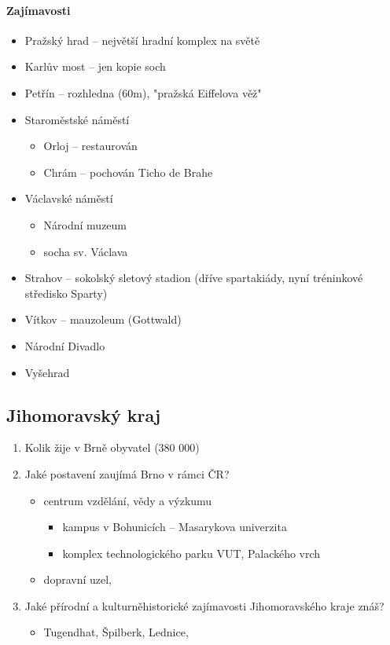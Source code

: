 \paragraph{Zajímavosti}
\begin{itemize}
\item Pražský hrad -- největší hradní komplex na světě
\item Karlův most -- jen kopie soch
\item Petřín -- rozhledna (60m), "pražská Eiffelova věž"
\item Staroměstské náměstí
	\begin{itemize}
	\item Orloj -- restaurován
	\item Chrám -- pochován Ticho de Brahe
	\end{itemize}
\item Václavské náměstí
	\begin{itemize}
	\item Národní muzeum
	\item socha sv. Václava
	\end{itemize}
\item Strahov -- sokolský sletový stadion (dříve spartakiády, nyní tréninkové středisko Sparty)
\item Vítkov -- mauzoleum (Gottwald)
\item Národní Divadlo
\item Vyšehrad		
\end{itemize}

\subsection{Jihomoravský kraj}
\begin{enumerate}
\item Kolik žije v Brně obyvatel (380 000)
\item Jaké postavení zaujímá Brno v rámci ČR?
	\begin{itemize}
	\item centrum vzdělání, vědy a výzkumu
		\begin{itemize}
		\item kampus v Bohunicích -- Masarykova univerzita
		\item komplex technologického parku VUT, Palackého vrch
		\end{itemize}
	\item dopravní uzel, 
	\end{itemize}
\item Jaké přírodní a kulturněhistorické zajímavosti Jihomoravského kraje znáš?
	\begin{itemize}
	\item Tugendhat, Špilberk, Lednice, 
	\end{itemize}
\end{enumerate}

